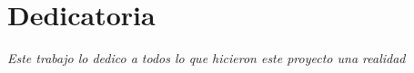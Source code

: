 \chapter{Dedicatoria}
\begin{flushright}
\itshape
\vspace{20ex}
Este trabajo lo dedico a todos lo que hicieron este proyecto una realidad

\end{flushright}
